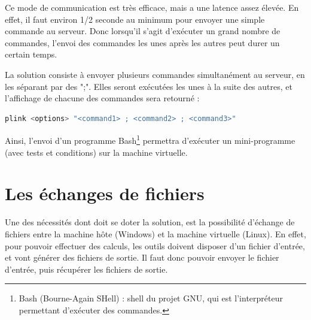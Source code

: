 Ce mode de communication est très efficace, mais a une latence assez élevée.
En effet, il faut environ 1/2 seconde au minimum pour envoyer une simple commande au serveur.
Donc lorsqu'il s'agit d'exécuter un grand nombre de commandes, l'envoi des commandes les unes après les autres peut durer un certain temps.

La solution consiste à envoyer plusieurs commandes simultanément au serveur, en les séparant par des ";".
Elles seront exécutées les unes à la suite des autres, et l'affichage de chacune des commandes sera retourné :
\begin{lstlisting}[language = sh]
plink <options> "<command1> ; <command2> ; <command3>"
\end{lstlisting}
Ainsi, l'envoi d'un programme Bash\footnote{Bash (Bourne-Again SHell) : shell du projet GNU, qui est l'interpréteur permettant d'exécuter des commandes.} permettra d'exécuter un mini-programme (avec tests et conditions) sur la machine virtuelle.
\\






\section{Les échanges de fichiers}
\label{Les échanges de fichiers}

Une des nécessités dont doit se doter la solution, est la possibilité d'échange de fichiers entre la machine hôte (Windows) et la machine virtuelle (Linux).
En effet, pour pouvoir effectuer des calculs, les outils doivent disposer d'un fichier d'entrée, et vont générer des fichiers de sortie.
Il faut donc pouvoir envoyer le fichier d'entrée, puis récupérer les fichiers de sortie.
\\





